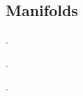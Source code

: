 \subsection{Manifolds}\label{subsec:manifolds}

\begin{definition}\label{def:topological_manifold}
  .
\end{definition}

\begin{definition}\label{def:smooth_manifold}
  .
\end{definition}

\begin{definition}\label{def:riemannian_manifold}
  .
\end{definition}
